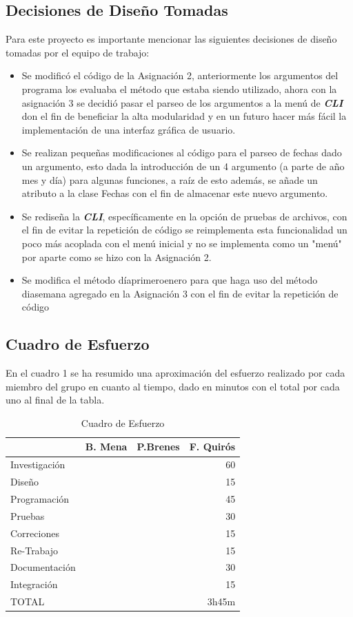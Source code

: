 \documentclass[10pt,journal,compsoc]{IEEEtran}
\begin{document}
\subsection{Decisiones de Diseño Tomadas}
	\par Para este proyecto es importante mencionar las siguientes decisiones de diseño tomadas por el equipo de trabajo:
	\begin{itemize}
		\item Se modificó el código de la Asignación 2, anteriormente los argumentos del programa los evaluaba el método que estaba siendo utilizado, ahora con la asignación 3 se decidió pasar el parseo de los argumentos a la menú de \textit{\textbf{CLI}} don el fin de beneficiar la alta modularidad y en un futuro hacer más fácil la implementación de una interfaz gráfica de usuario.
		\item Se realizan pequeñas modificaciones al código para el parseo de fechas dado un argumento, esto dada la introducción de un 4 argumento (a parte de año mes y día) para algunas funciones, a raíz de esto además, se añade un atributo a la clase Fechas con el fin de almacenar este nuevo argumento.
		\item Se rediseña la \textbf{\textit{CLI}}, específicamente en la opción de pruebas de archivos, con el fin de evitar la repetición de código se reimplementa esta funcionalidad un poco más acoplada con el menú inicial y no se implementa como un "menú" por aparte como se hizo con la Asignación 2.
		\item Se modifica el método día\textunderscore primero\textunderscore enero para que haga uso del método dia\textunderscore semana agregado en la Asignación 3 con el fin de evitar la repetición de código
	\end{itemize}

\subsection{Cuadro de Esfuerzo}
	\par En el cuadro 1 se ha resumido una aproximación del esfuerzo realizado por cada miembro del grupo en cuanto al tiempo, dado en minutos con el total por cada uno al final de la tabla.
	\begin{table}[H]
		\begin{center}
		\caption{Cuadro de Esfuerzo}
		\label{tab:table1}
		\begin{tabular}{l|R|R|R}
		&\textbf{B. Mena} & \textbf{P.Brenes} & \textbf{F. Quirós}\\
		\hline
		Investigación	& & &60 \\
		Diseño			& & &15 \\
		Programación 	& & &45 \\
		Pruebas 		& & &30 \\
		Correciones 	& & &15 \\
		Re-Trabajo 		& & &15 \\
		Documentación 	& & &30 \\
		Integración 	& & &15 \\
		\hline
		TOTAL 			& & &3h45m
\end{tabular}
\end{center}
\end{table}
\end{document}
